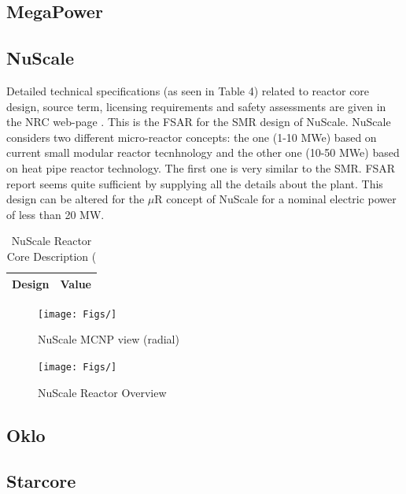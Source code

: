\documentclass[10pt,a4paper]{article}
\begin{document}
\subsection{MegaPower}

\subsection{NuScale}
Detailed technical specifications (as seen in Table 4) related to reactor core design, source term, licensing requirements and safety assessments are given in the NRC web-page \cite{NuScale18}. This is the FSAR for the SMR design of NuScale. NuScale considers two different micro-reactor concepts: the one (1-10 MWe) based on current small modular reactor tecnhnology and the other one (10-50 MWe) based on heat pipe reactor technology. The first one is very similar to the SMR. FSAR report  seems quite sufficient by supplying all the details about the plant. This design can be altered for the $\mu$R concept of NuScale for a nominal electric power of less than 20 MW.

\begin{table} [ht]
\begin{center}

\caption{NuScale Reactor Core Description (\cite{NuScale18}}
\begin{tabular}{|l|l|}
\hline 
Design 		&Value \\ 
\hline 

\end{tabular}
\end{center}
\end{table}

\begin{figure}[hbtp]
\centering
\texttt{[image: Figs/]}
\caption{NuScale MCNP view (radial)}
\end{figure}

\begin{figure}[hbtp]
\centering
\texttt{[image: Figs/]}
\caption{NuScale Reactor Overview}
\end{figure}

\subsection{Oklo}

\subsection{Starcore}
\end{document}

